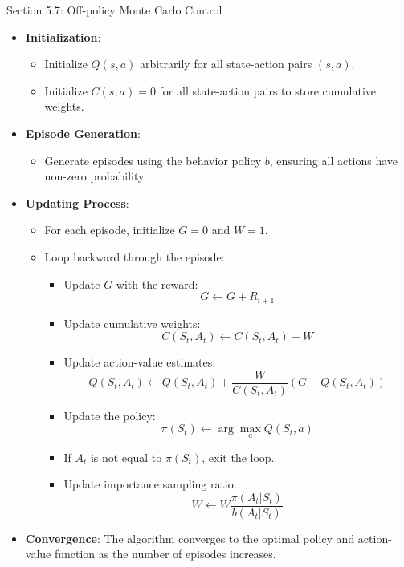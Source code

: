 \begin{notes}{Section 5.7: Off-policy Monte Carlo Control}
\begin{highlight}
        \begin{itemize}
            \item \textbf{Initialization}:
                \begin{itemize}
                    \item Initialize $Q(s, a)$ arbitrarily for all state-action pairs $(s, a)$.
                    \item Initialize $C(s, a) = 0$ for all state-action pairs to store cumulative weights.
                \end{itemize}
            \item \textbf{Episode Generation}:
                \begin{itemize}
                    \item Generate episodes using the behavior policy $b$, ensuring all actions have non-zero probability.
                \end{itemize}
            \item \textbf{Updating Process}:
                \begin{itemize}
                    \item For each episode, initialize $G = 0$ and $W = 1$.
                    \item Loop backward through the episode:
                        \begin{itemize}
                            \item Update $G$ with the reward:
                            \[
                            G \leftarrow G + R_{t+1}
                            \]
                            \item Update cumulative weights:
                            \[
                            C(S_t, A_t) \leftarrow C(S_t, A_t) + W
                            \]
                            \item Update action-value estimates:
                            \[
                            Q(S_t, A_t) \leftarrow Q(S_t, A_t) + \frac{W}{C(S_t, A_t)} (G - Q(S_t, A_t))
                            \]
                            \item Update the policy:
                            \[
                            \pi(S_t) \leftarrow \arg\max_a Q(S_t, a)
                            \]
                            \item If $A_t$ is not equal to $\pi(S_t)$, exit the loop.
                            \item Update importance sampling ratio:
                            \[
                            W \leftarrow W \frac{\pi(A_t|S_t)}{b(A_t|S_t)}
                            \]
                        \end{itemize}
                \end{itemize}
            \item \textbf{Convergence}: The algorithm converges to the optimal policy and action-value function as the number of episodes increases.
        \end{itemize}
    

\end{highlight}
\end{notes}
